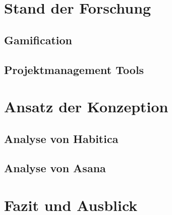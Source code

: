 \documentclass[sigconf, nonacm]{acmart}
\begin{document}
\section{Stand der Forschung}

\subsection{Gamification}

\subsection{Projektmanagement Tools}

\section{Ansatz der Konzeption}

\subsection{Analyse von Habitica}

\subsection{Analyse von Asana}

\section{Fazit und Ausblick}


\end{document}
